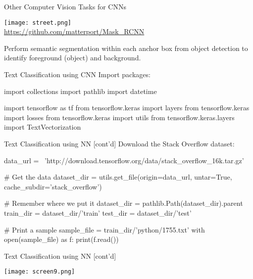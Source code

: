 \documentclass[ignorenonframetext,xcolor=x11names]{beamer}
\begin{document}
\begin{frame}{Other Computer Vision Tasks for CNNs}
\begin{center}
\texttt{[image: street.png]} \\

\scriptsize \url{https://github.com/matterport/Mask_RCNN}
\end{center}

\normalsize
Perform semantic segmentation within each anchor box from object detection to identify foreground (object) and background. 
\end{frame}


\begin{frame}[fragile]{Text Classification using CNN}
Import packages:
\begin{pythoncode}
import collections
import pathlib
import datetime

import tensorflow as tf
from tensorflow.keras import layers
from tensorflow.keras import losses
from tensorflow.keras import utils
from tensorflow.keras.layers import TextVectorization
\end{pythoncode}
\end{frame}

\begin{frame}[fragile]{Text Classification using NN \small [cont'd]}
Download the Stack Overflow dataset:
\begin{pythoncode}
data_url = \
'http://download.tensorflow.org/data/stack_overflow_16k.tar.gz'

# Get the data
dataset_dir = utils.get_file(origin=data_url, untar=True,
               cache_subdir='stack_overflow')

# Remember where we put it
dataset_dir = pathlib.Path(dataset_dir).parent
train_dir = dataset_dir/'train'
test_dir = dataset_dir/'test'

# Print a sample
sample_file = train_dir/'python/1755.txt'
with open(sample_file) as f:
    print(f.read())
\end{pythoncode}
\end{frame}


\begin{frame}[fragile]{Text Classification using NN \small [cont'd]}
\centering

\texttt{[image: screen9.png]}
\end{frame}
\end{document}
